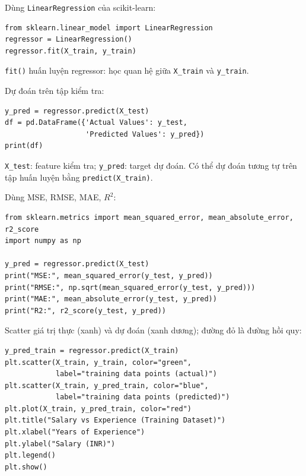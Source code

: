 \begin{vidu}[title={Bước 2: Huấn luyện mô hình}]
Dùng \texttt{LinearRegression} của scikit-learn:

\begin{lstlisting}
from sklearn.linear_model import LinearRegression
regressor = LinearRegression()
regressor.fit(X_train, y_train)
\end{lstlisting}

\texttt{fit()} huấn luyện regressor: học quan hệ giữa \texttt{X\_train} và \texttt{y\_train}.
\end{vidu}

\begin{vidu}[title={Bước 3: Kiểm thử mô hình}]
Dự đoán trên tập kiểm tra:

\begin{lstlisting}
y_pred = regressor.predict(X_test)
df = pd.DataFrame({'Actual Values': y_test,
                   'Predicted Values': y_pred})
print(df)
\end{lstlisting}

\texttt{X\_test}: feature kiểm tra; \texttt{y\_pred}: target dự đoán.
Có thể dự đoán tương tự trên tập huấn luyện bằng \texttt{predict(X\_train)}.
\end{vidu}

\begin{vidu}[title={Bước 4: Đánh giá mô hình}]
Dùng MSE, RMSE, MAE, $R^2$:

\begin{lstlisting}
from sklearn.metrics import mean_squared_error, mean_absolute_error, r2_score
import numpy as np

y_pred = regressor.predict(X_test)
print("MSE:", mean_squared_error(y_test, y_pred))
print("RMSE:", np.sqrt(mean_squared_error(y_test, y_pred)))
print("MAE:", mean_absolute_error(y_test, y_pred))
print("R2:", r2_score(y_test, y_pred))
\end{lstlisting}
\end{vidu}

\begin{vidu}[title={Bước 5: Trực quan tập huấn luyện}]
Scatter giá trị thực (xanh) và dự đoán (xanh dương); đường đỏ là đường hồi quy:

\begin{lstlisting}
y_pred_train = regressor.predict(X_train)
plt.scatter(X_train, y_train, color="green",
            label="training data points (actual)")
plt.scatter(X_train, y_pred_train, color="blue",
            label="training data points (predicted)")
plt.plot(X_train, y_pred_train, color="red")
plt.title("Salary vs Experience (Training Dataset)")
plt.xlabel("Years of Experience")
plt.ylabel("Salary (INR)")
plt.legend()
plt.show()
\end{lstlisting}

\end{vidu}

